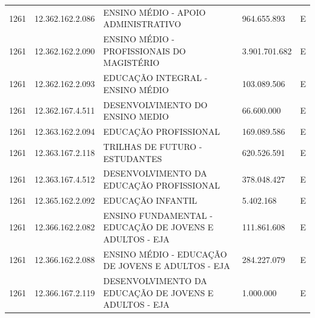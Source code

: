 \documentclass{article}
\begin{document}
\begin{longtable}[c]{m{1cm}|m{2cm}|m{10cm}|m{2cm}|m{1cm}}
\multicolumn{1}{C{1cm}|}{1261} & \multicolumn{1}{C{2cm}|}{12.362.162.2.086} & \multicolumn{1}{L{10cm}|}{ENSINO MÉDIO - APOIO ADMINISTRATIVO} & \multicolumn{1}{R{2cm}|}{964.655.893} & \multicolumn{1}{C{1cm}}{E} \\
\multicolumn{1}{C{1cm}|}{1261} & \multicolumn{1}{C{2cm}|}{12.362.162.2.090} & \multicolumn{1}{L{10cm}|}{ENSINO MÉDIO - PROFISSIONAIS DO MAGISTÉRIO} & \multicolumn{1}{R{2cm}|}{3.901.701.682} & \multicolumn{1}{C{1cm}}{E} \\
\multicolumn{1}{C{1cm}|}{1261} & \multicolumn{1}{C{2cm}|}{12.362.162.2.093} & \multicolumn{1}{L{10cm}|}{EDUCAÇÃO INTEGRAL - ENSINO MÉDIO} & \multicolumn{1}{R{2cm}|}{103.089.506} & \multicolumn{1}{C{1cm}}{E} \\
\multicolumn{1}{C{1cm}|}{1261} & \multicolumn{1}{C{2cm}|}{12.362.167.4.511} & \multicolumn{1}{L{10cm}|}{DESENVOLVIMENTO DO ENSINO MEDIO} & \multicolumn{1}{R{2cm}|}{66.600.000} & \multicolumn{1}{C{1cm}}{E} \\
\multicolumn{1}{C{1cm}|}{1261} & \multicolumn{1}{C{2cm}|}{12.363.162.2.094} & \multicolumn{1}{L{10cm}|}{EDUCAÇÃO PROFISSIONAL} & \multicolumn{1}{R{2cm}|}{169.089.586} & \multicolumn{1}{C{1cm}}{E} \\
\multicolumn{1}{C{1cm}|}{1261} & \multicolumn{1}{C{2cm}|}{12.363.167.2.118} & \multicolumn{1}{L{10cm}|}{TRILHAS DE FUTURO - ESTUDANTES} & \multicolumn{1}{R{2cm}|}{620.526.591} & \multicolumn{1}{C{1cm}}{E} \\
\multicolumn{1}{C{1cm}|}{1261} & \multicolumn{1}{C{2cm}|}{12.363.167.4.512} & \multicolumn{1}{L{10cm}|}{DESENVOLVIMENTO DA EDUCAÇÃO PROFISSIONAL} & \multicolumn{1}{R{2cm}|}{378.048.427} & \multicolumn{1}{C{1cm}}{E} \\
\multicolumn{1}{C{1cm}|}{1261} & \multicolumn{1}{C{2cm}|}{12.365.162.2.092} & \multicolumn{1}{L{10cm}|}{EDUCAÇÃO INFANTIL} & \multicolumn{1}{R{2cm}|}{5.402.168} & \multicolumn{1}{C{1cm}}{E} \\
\multicolumn{1}{C{1cm}|}{1261} & \multicolumn{1}{C{2cm}|}{12.366.162.2.082} & \multicolumn{1}{L{10cm}|}{ENSINO FUNDAMENTAL - EDUCAÇÃO DE JOVENS E ADULTOS - EJA} & \multicolumn{1}{R{2cm}|}{111.861.608} & \multicolumn{1}{C{1cm}}{E} \\
\multicolumn{1}{C{1cm}|}{1261} & \multicolumn{1}{C{2cm}|}{12.366.162.2.088} & \multicolumn{1}{L{10cm}|}{ENSINO MÉDIO - EDUCAÇÃO DE JOVENS E ADULTOS - EJA} & \multicolumn{1}{R{2cm}|}{284.227.079} & \multicolumn{1}{C{1cm}}{E} \\
\multicolumn{1}{C{1cm}|}{1261} & \multicolumn{1}{C{2cm}|}{12.366.167.2.119} & \multicolumn{1}{L{10cm}|}{DESENVOLVIMENTO DA EDUCAÇÃO DE JOVENS E ADULTOS - EJA} & \multicolumn{1}{R{2cm}|}{1.000.000} & \multicolumn{1}{C{1cm}}{E} \\

\end{longtable}
\end{document}

